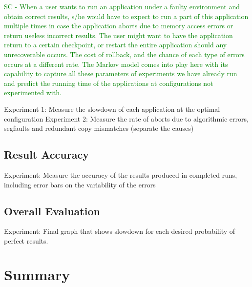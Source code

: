 \documentclass{sig-alternate}
\newcommand{\sui}[1]{%
  \textcolor{green}{SC - #1}
}
\begin{document}
\sui{When a user wants to run an application under a faulty environment and obtain correct results, s/he would have to expect to run a part of this application multiple times in case the application aborts due to memory access errors or return useless incorrect results. The user might want to have the application return to a certain checkpoint, or restart the entire application should any unrecoverable occurs. The cost of rollback, and the chance of each type of errors occurs at a different rate. The Markov model comes into play here with its capability to capture all these parameters of experiments we have already run and predict the running time of the applications at configurations not experimented with.}


Experiment 1: Measure the slowdown of each application at the optimal configuration
Experiment 2: Measure the rate of aborts due to algorithmic errors, segfaults and redundant copy mismatches (separate the causes)

\subsection{Result Accuracy}
\label{sec:eval:acc}

Experiment: Measure the accuracy of the results produced in completed runs, including error bars on the variability of the errors

\subsection{Overall Evaluation}
\label{sec:eval:overall}

Experiment: Final graph that shows slowdown for each desired probability of perfect results.

\section{Summary}
\label{sec:summary}



\end{document}

